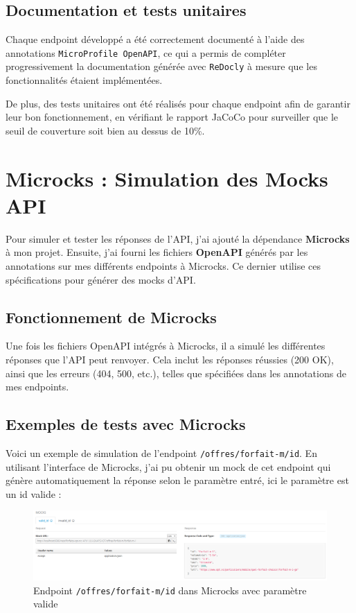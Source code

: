 \documentclass[11pt]{article}
\begin{document}
		
		\subsection*{Documentation et tests unitaires}
		
		Chaque endpoint développé a été correctement documenté à l'aide des annotations \texttt{MicroProfile OpenAPI}, ce qui a permis de compléter progressivement la documentation générée avec \texttt{ReDocly} à mesure que les fonctionnalités étaient implémentées.
		
		De plus, des tests unitaires ont été réalisés pour chaque endpoint afin de garantir leur bon fonctionnement, en vérifiant le rapport JaCoCo pour surveiller que le seuil de couverture soit bien au dessus de 10\%.
		
		\section{Microcks : Simulation des Mocks API}
		
		Pour simuler et tester les réponses de l'API, j'ai ajouté la dépendance \textbf{Microcks} à mon projet. Ensuite, j'ai fourni les fichiers \textbf{OpenAPI} générés par les annotations sur mes différents endpoints à Microcks. Ce dernier utilise ces spécifications pour générer des mocks d'API.
		
		\subsection*{Fonctionnement de Microcks}
		
		Une fois les fichiers OpenAPI intégrés à Microcks, il a simulé les différentes réponses que l'API peut renvoyer. Cela inclut les réponses réussies (200 OK), ainsi que les erreurs (404, 500, etc.), telles que spécifiées dans les annotations de mes endpoints.
		
		\subsection*{Exemples de tests avec Microcks}
		
		Voici un exemple de simulation de l'endpoint \texttt{/offres/forfait-m/{id}}. En utilisant l'interface de Microcks, j'ai pu obtenir un mock de cet endpoint qui génère automatiquement la réponse selon le paramètre entré, ici le paramètre est un id valide : 
		
		\begin{figure}[H]
			\centering
			\includegraphics[width=\textwidth]{asset/mock_forfaitm.png}
			\caption{Endpoint \texttt{/offres/forfait-m/{id}} dans Microcks avec paramètre valide}
			\label{fig:endpoint-offres/forfait-m/{id}}
		\end{figure}
		
\end{document}
